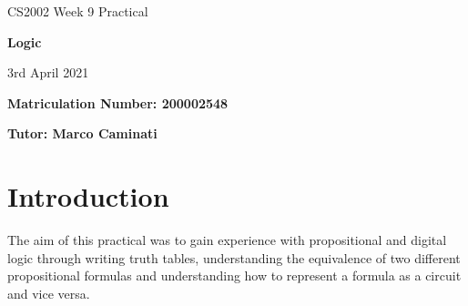 \documentclass{article}
\begin{document}
    \nocite{*}

    \begin{center}
        \Huge
        CS2002 Week 9 Practical

        \vspace{0.5cm}

        \textbf{Logic}

        \vspace{1cm}
        \LARGE
        3rd April 2021

        \large
        \vspace{1.5cm}

        \textbf{Matriculation Number: 200002548}

        \vspace{0.5cm}

        \textbf{Tutor: Marco Caminati}

    \end{center}

    \vspace*{3cm}

    \tableofcontents

    \newpage
    \section{Introduction}
    The aim of this practical was to gain experience with propositional and digital logic
    through writing truth tables, understanding the equivalence of two different propositional
    formulas and understanding how to represent a formula as a circuit and vice versa.
\end{document}
